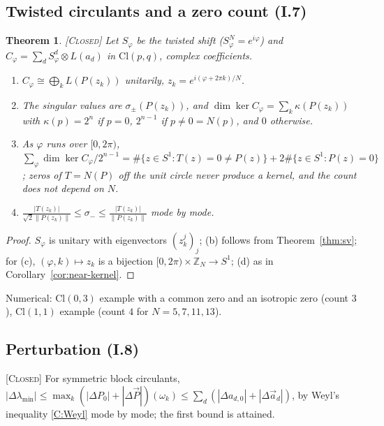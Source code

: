 \documentclass[11pt]{amsart}
\theoremstyle{plain}
\newtheorem{theorem}{Theorem}[section]
\theoremstyle{definition}
\newcommand{\Cl}{\mathrm{Cl}}
\newcommand{\status}[1]{\textsc{[#1]}}
\begin{document}
\subsection{Twisted circulants and a zero count (I.7)}
\begin{theorem}\status{Closed}
Let $S_\varphi$ be the twisted shift ($S_\varphi^N=e^{i\varphi}$) and
$C_\varphi=\sum_dS_\varphi^d\otimes L(a_d)$ in $\Cl(p,q)$, complex coefficients.
\begin{enumerate}[label=(\alph*)]
\item $C_\varphi\cong\bigoplus_kL(P(z_k))$ unitarily, $z_k=e^{i(\varphi+2\pi k)/N}$.
\item The singular values are $\sigma_\pm(P(z_k))$, and
$\dim\ker C_\varphi=\sum_k\kappa(P(z_k))$ with $\kappa(p)=2^n$ if $p=0$,
$2^{n-1}$ if $p\neq0=N(p)$, and $0$ otherwise.
\item As $\varphi$ runs over $[0,2\pi)$,
$\sum_\varphi\dim\ker C_\varphi/2^{n-1}=\#\{z\in S^1:T(z)=0\ne P(z)\}+2\#\{z\in S^1:P(z)=0\}$;
zeros of $T=N(P)$ off the unit circle never produce a kernel, and the count does not depend on $N$.
\item $\frac{|T(z_k)|}{\sqrt2\|P(z_k)\|}\le\sigma_-\le\frac{|T(z_k)|}{\|P(z_k)\|}$ mode by mode.
\end{enumerate}
\end{theorem}
\begin{proof}
$S_\varphi$ is unitary with eigenvectors $(z_k^j)_j$; (b) follows from
Theorem~\ref{thm:sv}; for (c), $(\varphi,k)\mapsto z_k$ is a bijection
$[0,2\pi)\times\mathbb Z_N\to S^1$; (d) as in Corollary~\ref{cor:near-kernel}.
\end{proof}
\noindent Numerical: $\Cl(0,3)$ example with a common zero and an isotropic zero (count $3$), $\Cl(1,1)$ example (count $4$ for $N=5,7,11,13$).

\subsection{Perturbation (I.8)}
\status{Closed} For symmetric block circulants,
$|\Delta\lambda_{\min}|\le\max_k(|\Delta P_0|+|\Delta\vec P|)(\omega_k)\le\sum_d(|\Delta a_{d,0}|+|\Delta\vec a_d|)$,
by Weyl's inequality \ref{C:Weyl} mode by mode; the first bound is attained.
\end{document}
